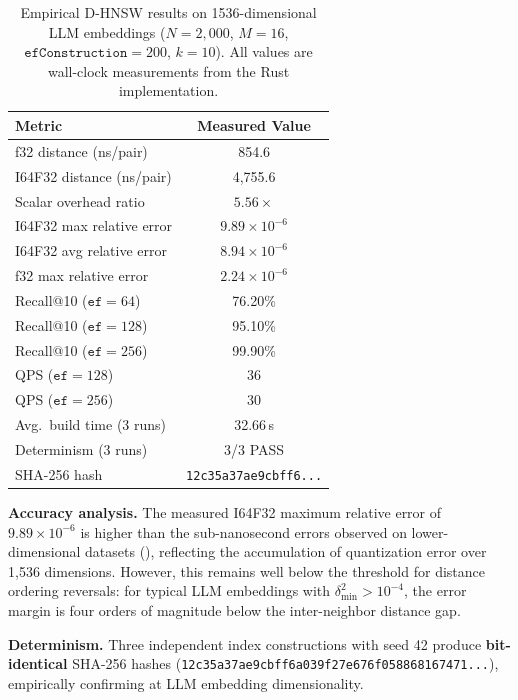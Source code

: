\documentclass[10pt,journal]{IEEEtran}
\newcommand{\dhnsw}{\textsc{D-HNSW}}
\begin{document}
\begin{table}[t]
  \centering
  \caption{Empirical \dhnsw{} results on 1536-dimensional LLM embeddings ($N{=}2{,}000$, $M{=}16$, $\texttt{efConstruction}{=}200$, $k{=}10$). All values are wall-clock measurements from the Rust implementation.}
  \label{tab:llm_results}
  \footnotesize
  \begin{tabular}{lc}
    \toprule
    \textbf{Metric} & \textbf{Measured Value} \\
    \midrule
    f32 distance (ns/pair)      & 854.6 \\
    I64F32 distance (ns/pair)   & 4{,}755.6 \\
    Scalar overhead ratio       & $5.56\times$ \\
    I64F32 max relative error   & $9.89 \times 10^{-6}$ \\
    I64F32 avg relative error   & $8.94 \times 10^{-6}$ \\
    f32 max relative error      & $2.24 \times 10^{-6}$ \\
    Recall@10 ($\texttt{ef}{=}64$)  & 76.20\% \\
    Recall@10 ($\texttt{ef}{=}128$) & 95.10\% \\
    Recall@10 ($\texttt{ef}{=}256$) & 99.90\% \\
    QPS ($\texttt{ef}{=}128$)   & 36 \\
    QPS ($\texttt{ef}{=}256$)   & 30 \\
    Avg.\ build time (3 runs)   & 32.66\,s \\
    Determinism (3 runs)        & 3/3 PASS \\
    SHA-256 hash                & \texttt{12c35a37ae9cbff6...} \\
    \bottomrule
  \end{tabular}
\end{table}

\textbf{Accuracy analysis.} The measured I64F32 maximum relative error of $9.89 \times 10^{-6}$ is higher than the sub-nanosecond errors observed on lower-dimensional datasets (), reflecting the accumulation of quantization error over 1{,}536 dimensions. However, this remains well below the threshold for distance ordering reversals: for typical LLM embeddings with $\delta_\text{min}^2 > 10^{-4}$, the error margin is four orders of magnitude below the inter-neighbor distance gap.

\textbf{Determinism.} Three independent index constructions with seed 42 produce \textbf{bit-identical} SHA-256 hashes (\texttt{12c35a37ae9cbff6a039f27e676f058868167471...}), empirically confirming  at LLM embedding dimensionality.
\end{document}
